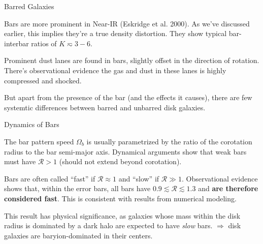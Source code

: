 \documentclass[letterpaper,landscape]{slides}
\begin{document}
\begin{slide}
\begin{center}
{\large \color{red} 
                  Barred Galaxies  }
\end{center}

Bars are more prominent in Near-IR (Eskridge et al. 2000). As we've
discussed earlier, this implies they're a true density distortion. They show
typical bar-interbar ratios of $K \eqsim 3-6$.

Prominent dust lanes are found in bars, slightly offset in the direction of
rotation. There's observational evidence the gas and dust in these lanes is
highly compressed and shocked.

But apart from the presence of the bar (and the effects it causes), there
are few systemtic differences between barred and unbarred disk galaxies.

\vfill
\end{slide}


\begin{slide}
\begin{center}
{\large \color{red} 
                  Dynamics of Bars  }
\end{center}

The bar pattern speed $\Omega_b$ is usually parametrized by the ratio
of the corotation radius to the bar semi-major axis. Dynamical arguments
show that weak bars must have $\mathcal{R} > 1$ (should not extend beyond
corotation).

Bars are often called ``fast'' if $\mathcal{R} \approx 1$ and ``slow'' if
$\mathcal{R} \gg 1$.  Observational evidence shows that, within the error
bars, all bars have $0.9 \lesssim \mathcal{R} \lesssim 1.3$ and {\bf are
therefore considered fast}. This is consistent with results from
numerical modeling.

This result has physical significance, as galaxies whose mass within the
disk radius is dominated by a dark halo are expected to have {\em slow}
bars. $\Rightarrow$ disk galaxies are baryion-dominated in their centers.

\vfill
\end{slide}
\end{document}
